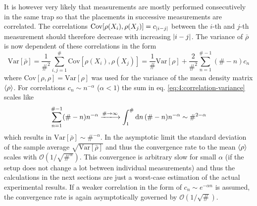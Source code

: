 It is however very likely that measurements are mostly performed consecutively in the same trap so that the placements in successive measurements are correlated.
The correlations $\mathrm{Cov}[\rho(X_i), \rho(X_j)] = c_{\left\lvert i-j\right\rvert}$ between the $i$-th and $j$-th measurement should therefore decrease with increasing $\left\lvert i-j\right\rvert$.
The variance of $\bar{\rho}$ is now dependent of these correlations in the form \cite[p. 1227]{Riley_2018}
\begin{equation}\label{eq:4:correlation-variance}
  \mathrm{Var}[\bar{\rho}] = \frac{1}{\#^2} \sum_{i,j=1}^{\#} \mathrm{Cov}[\rho(X_i), \rho(X_j)] = \frac{1}{\#}\mathrm{Var}[\rho] + \frac{2}{\#^2}\sum_{n=1}^{\# - 1}(\# - n) c_n
\end{equation}
where $\mathrm{Cov}[\rho, \rho] = \mathrm{Var}[\rho]$ was used for the variance of the mean density matrix $\left\langle\rho\right\rangle$.
For correlations $c_n \sim n^{-\alpha}$ ($\alpha < 1$) the sum in eq. \eqref{eq:4:correlation-variance} scales like
\begin{equation}
  \sum_{n=1}^{\# - 1}(\# - n)n^{-\alpha} \xlongrightarrow{\#\rightarrow\infty} \int_1^{\#}\dd n \, (\#-n)n^{-\alpha} \sim \#^{2-\alpha}
\end{equation}
which results in $\mathrm{Var}[\bar{\rho}] \sim \#^{-\alpha}$. In the asymptotic limit the standard deviation of the sample average $\sqrt{\mathrm{Var}[\bar{\rho}]}$ and thus the convergence rate to the mean $\left\langle\rho\right\rangle$ scales with $\mathcal{O}(1/\sqrt{\#^\alpha})$.
This convergence is arbitrary slow for small $\alpha$ (if the setup does not change a lot between individual measurements) and thus the calculations in the next sections are just a worst-case estimation of the actual experimental results.
If a weaker correlation in the form of $c_n \sim e^{-\alpha n}$ is assumed, the convergence rate is again asymptotically governed by $\mathcal{O}(1/\sqrt{\#})$.










